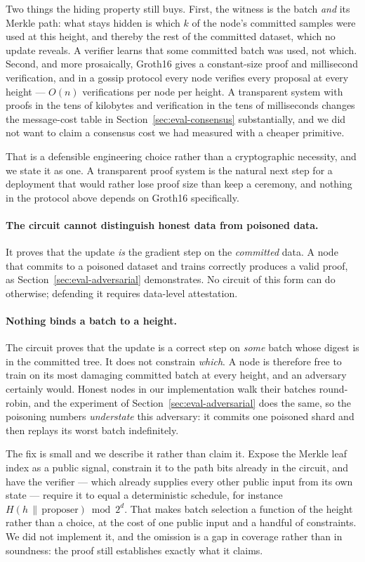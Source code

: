 \documentclass{llncs}
\begin{document}
Two things the hiding property still buys. First, the witness is the batch
\emph{and} its Merkle path: what stays hidden is which $k$ of the node's
committed samples were used at this height, and thereby the rest of the
committed dataset, which no update reveals. A verifier learns that some
committed batch was used, not which. Second, and more prosaically, Groth16 gives
a constant-size proof and millisecond verification, and in a gossip protocol
every node verifies every proposal at every height --- $O(n)$ verifications per
node per height. A transparent system with proofs in the tens of kilobytes and
verification in the tens of milliseconds changes the message-cost table in
Section~\ref{sec:eval-consensus} substantially, and we did not want to claim a
consensus cost we had measured with a cheaper primitive.

That is a defensible engineering choice rather than a cryptographic necessity,
and we state it as one. A transparent proof system is the natural next step for
a deployment that would rather lose proof size than keep a ceremony, and nothing
in the protocol above depends on Groth16 specifically.

\paragraph{The circuit cannot distinguish honest data from poisoned data.}
It proves that the update \emph{is} the gradient step on the \emph{committed}
data. A node that commits to a poisoned dataset and trains correctly produces a
valid proof, as Section~\ref{sec:eval-adversarial} demonstrates. No circuit of
this form can do otherwise; defending it requires data-level attestation.

\paragraph{Nothing binds a batch to a height.}
The circuit proves that the update is a correct step on \emph{some} batch whose
digest is in the committed tree. It does not constrain \emph{which}. A node is
therefore free to train on its most damaging committed batch at every height,
and an adversary certainly would. Honest nodes in our implementation walk their
batches round-robin, and the experiment of
Section~\ref{sec:eval-adversarial} does the same, so the poisoning numbers
\emph{understate} this adversary: it commits one poisoned shard and then replays
its worst batch indefinitely.

The fix is small and we describe it rather than claim it. Expose the Merkle leaf
index as a public signal, constrain it to the path bits already in the circuit,
and have the verifier --- which already supplies every other public input from
its own state --- require it to equal a deterministic schedule, for instance
$H(h \,\|\, \text{proposer}) \bmod 2^d$. That makes batch selection a function of
the height rather than a choice, at the cost of one public input and a handful
of constraints. We did not implement it, and the omission is a gap in coverage
rather than in soundness: the proof still establishes exactly what it claims.
\end{document}
